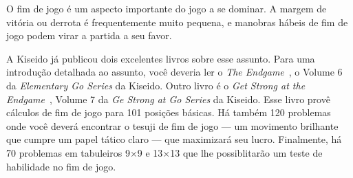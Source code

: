 O fim de jogo é um aspecto importante do jogo a se dominar. A margem de vitória ou derrota é frequentemente muito pequena, e manobras hábeis de fim de jogo podem virar a partida a seu favor.

A Kiseido já publicou dois excelentes livros sobre esse assunto. Para uma introdução detalhada ao assunto, você deveria ler o \emph{The Endgame}~\cite{tomoko_bozulich_endgame}, o Volume 6 da \emph{Elementary Go Series} da Kiseido. Outro livro é o \emph{Get Strong at the Endgame}~\cite{bozulich_endgame}, Volume 7 da \emph{Ge Strong at Go Series} da Kiseido. Esse livro provê cálculos de fim de jogo para 101 posições básicas. Há também 120 problemas onde você deverá encontrar o tesuji de fim de jogo --- um movimento brilhante que cumpre um papel tático claro --- que maximizará seu lucro. Finalmente, há 70 problemas em tabuleiros 9\(\times\)9 e 13\(\times\)13 que lhe possiblitarão um teste de habilidade no fim de jogo.